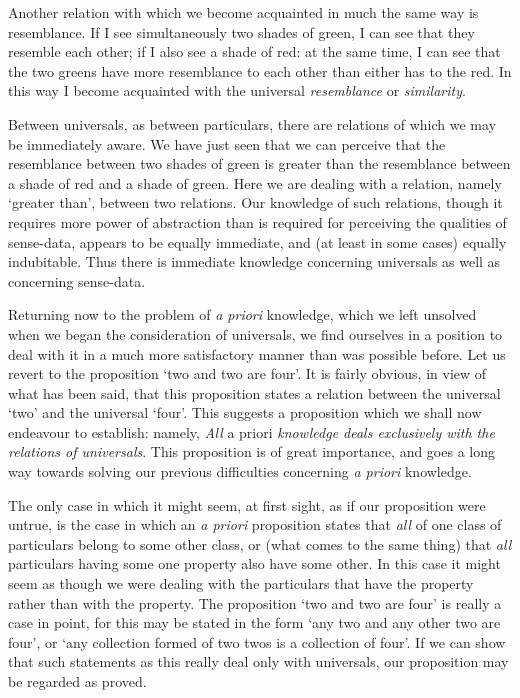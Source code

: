 \documentclass[oneside,letterpaper,12pt]{book}
\begin{document}
\label{resemblance} Another relation with which we become acquainted in much the same way is
resemblance. If I see simultaneously two shades of green, I can see that
they resemble each other; if I also see a shade of red: at the same
time, I can see that the two greens have more resemblance to each other
than either has to the red. In this way I become acquainted with the
universal \emph{resemblance} or \emph{similarity}.

Between universals, as between particulars, there are relations of which
we may be immediately aware. We have just seen that we can perceive that
the resemblance between two shades of green is greater than the
resemblance between a shade of red and a shade of green. Here we are
dealing with a relation, namely `greater
than', between two relations. Our knowledge of such
relations, though it requires more power of abstraction than is required
for perceiving the qualities of sense-data, appears to be equally
immediate, and (at least in some cases) equally indubitable. Thus there
is immediate knowledge concerning universals as well as concerning
sense-data.

Returning now to the problem of \emph{a priori} knowledge, which we left
unsolved when we began the consideration of universals, we find
ourselves in a position to deal with it in a much more satisfactory
manner than was possible before. Let us revert to the proposition
`two and two are four'. It is fairly
obvious, in view of what has been said, that this proposition states a
relation between the universal `two'
and the universal `four'. This suggests a
proposition which we shall now endeavour to establish: namely,
\label{apriori} \emph{All} a priori \emph{knowledge deals exclusively with the relations
of universals}. This proposition is of great importance, and goes a long
way towards solving our previous difficulties concerning \emph{a priori}
knowledge.

The only case in which it might seem, at first sight, as if our
proposition were untrue, is the case in which an \emph{a priori}
proposition states that \emph{all} of one class of particulars belong to
some other class, or (what comes to the same thing) that \emph{all}
particulars having some one property also have some other. In this case
it might seem as though we were dealing with the particulars that have
the property rather than with the property. \label{couples} The proposition
`two and two are four' is really a case
in point, for this may be stated in the form `any two
and any other two are four', or `any
collection formed of two twos is a collection of four'.
If we can show that such statements as this really deal only with
universals, our proposition may be regarded as proved.
\end{document}
